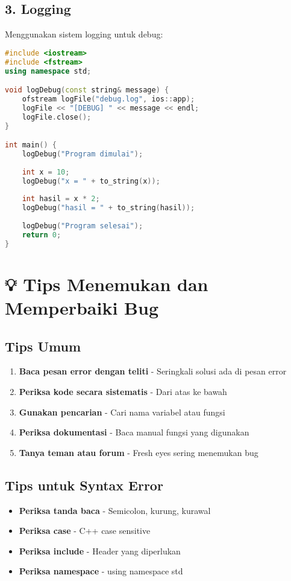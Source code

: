 \subsection{3. Logging}

Menggunakan sistem logging untuk debug:

\begin{lstlisting}[language=c++, caption=Logging Debug]
#include <iostream>
#include <fstream>
using namespace std;

void logDebug(const string& message) {
    ofstream logFile("debug.log", ios::app);
    logFile << "[DEBUG] " << message << endl;
    logFile.close();
}

int main() {
    logDebug("Program dimulai");
    
    int x = 10;
    logDebug("x = " + to_string(x));
    
    int hasil = x * 2;
    logDebug("hasil = " + to_string(hasil));
    
    logDebug("Program selesai");
    return 0;
}
\end{lstlisting}

\section{💡 Tips Menemukan dan Memperbaiki Bug}

\subsection{Tips Umum}

\begin{enumerate}
\item \textbf{Baca pesan error dengan teliti} - Seringkali solusi ada di pesan error
\item \textbf{Periksa kode secara sistematis} - Dari atas ke bawah
\item \textbf{Gunakan pencarian} - Cari nama variabel atau fungsi
\item \textbf{Periksa dokumentasi} - Baca manual fungsi yang digunakan
\item \textbf{Tanya teman atau forum} - Fresh eyes sering menemukan bug
\end{enumerate}

\subsection{Tips untuk Syntax Error}

\begin{itemize}
\item \textbf{Periksa tanda baca} - Semicolon, kurung, kurawal
\item \textbf{Periksa case} - C++ case sensitive
\item \textbf{Periksa include} - Header yang diperlukan
\item \textbf{Periksa namespace} - using namespace std
\end{itemize}

